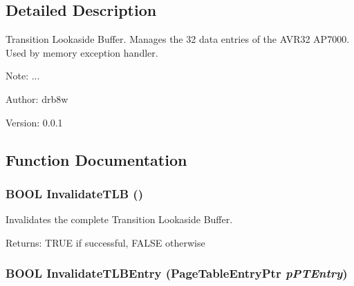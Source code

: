 \subsection{Detailed Description}
Transition Lookaside Buffer. Manages the 32 data entries of the AVR32 AP7000. Used by memory exception handler. 

\begin{Desc}
\item[Note:]... \end{Desc}
\begin{Desc}
\item[Author:]drb8w \end{Desc}
\begin{Desc}
\item[Version:]0.0.1 \end{Desc}


\subsection{Function Documentation}
\hypertarget{group___v_m_m___t_l_b_g89da6e0c2dad7972fda18e737fb06a84}{
\subsubsection[{InvalidateTLB}]{\setlength{\rightskip}{0pt plus 5cm}BOOL InvalidateTLB ()}}
\label{group___v_m_m___t_l_b_g89da6e0c2dad7972fda18e737fb06a84}


Invalidates the complete Transition Lookaside Buffer. \begin{Desc}
\item[Returns:]TRUE if successful, FALSE otherwise \end{Desc}
\hypertarget{group___v_m_m___t_l_b_g0aef1a11aac9970e992625e68280cad0}{
\subsubsection[{InvalidateTLBEntry}]{\setlength{\rightskip}{0pt plus 5cm}BOOL InvalidateTLBEntry ({\bf PageTableEntryPtr} {\em pPTEntry})}}
\label{group___v_m_m___t_l_b_g0aef1a11aac9970e992625e68280cad0}


